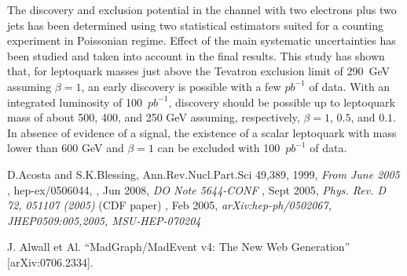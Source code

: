 \documentclass{cmspaper}
\begin{document}
\begin{linenumbers}
The discovery and exclusion potential in the channel with two electrons plus two jets has 
been determined using two statistical estimators suited for a counting experiment in Poissonian regime.
Effect of the main systematic uncertainties has been studied and taken into account in the final 
results. This study has shown that, 
for leptoquark masses just above the Tevatron exclusion limit of 290~GeV assuming $\beta=1$, 
an early discovery is possible with a few $pb^{-1}$ of data.
With an integrated luminosity of 100~$pb^{-1}$, discovery should be possible up
to leptoquark mass of about 500, 400, and 250 GeV assuming, respectively, 
$\beta=1$, $0.5$, and $0.1$. 
In absence of evidence of a signal, the existence of a scalar leptoquark 
with mass lower than 600 GeV and $\beta=1$ can be excluded with 100~$pb^{-1}$ of data.



\begin{thebibliography}{}

 {D.Acosta and S.K.Blessing, Ann.Rev.Nucl.Part.Sci 49,389},
  1999,
  {\em From June 2005}
, hep-ex/0506044,
, Jun 2008,
  {\em DO Note 5644-CONF}
, Sept 2005,
  {\em Phys. Rev. D 72, 051107 (2005)} (CDF paper)
, Feb 2005,
  {\em arXiv:hep-ph/0502067, JHEP0509:005,2005, MSU-HEP-070204}
  
  
  J. Alwall et Al.
  ``MadGraph/MadEvent v4: The New Web Generation''
  [arXiv:0706.2334].
  
  

\end{thebibliography}
\end{linenumbers}
\end{document}
